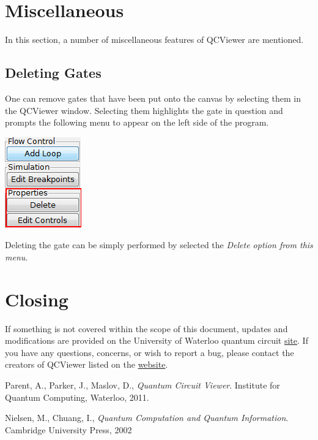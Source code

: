 \documentclass[10pt]{article}
\theoremstyle{definition}
\begin{document}
\section{Miscellaneous}\label{sec:Miscellaneous}

In this section, a number of miscellaneous features of QCViewer are mentioned.

\subsection{Deleting Gates}

One can remove gates that have been put onto the canvas by selecting them in the QCViewer window. Selecting them highlights the gate in question and prompts the following menu to appear on the left side of the program.

\begin{center}
\includegraphics{Figures/Misc/DeleteMenu.png}
\end{center}

Deleting the gate can be simply performed by selected the \em Delete \em option from this menu.

\section{Closing}
If something is not covered within the scope of this document, updates and modifications are provided on the University of Waterloo quantum circuit \href{http://qcirc.iqc.uwaterloo.ca/index.php?n=Projects.QCViewer}{site}. If you have any questions, concerns, or wish to report a bug, please contact the creators of QCViewer listed on the \href{http://qcirc.iqc.uwaterloo.ca/index.php?n=Projects.QCViewer}{website}.

\begin{thebibliography}{9}


  Parent, A., Parker, J., Maslov, D.,
  \emph{Quantum Circuit Viewer}.
  Institute for Quantum Computing, Waterloo,
  2011.

  Nielsen, M., Chuang, I.,
  \emph{Quantum Computation and Quantum Information}.
   Cambridge University Press,
   2002

\end{thebibliography}
\end{document}
